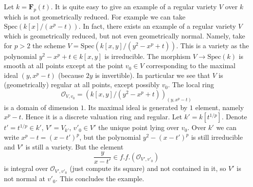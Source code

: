 \begin{example}
\label{example-geometrically-reduced-not-normal}
Let $k =\mathbf{F}_p(t)$. It is quite easy to give an example of a regular
variety $V$ over $k$ which is not geometrically reduced. For example we
can take $\text{Spec}(k[x]/(x^p - t))$. In fact, there exists an
example of a regular variety $V$ which is geometrically reduced, but
not even geometrically normal. Namely, take for $p > 2$ the scheme
$V = \text{Spec}(k[x, y]/(y^2 - x^p + t))$. This is a variety as the
polynomial $y^2 - x^p + t \in k[x, y]$ is irreducible.
The morphism $V \to \text{Spec}(k)$ is smooth at all points
except at the point $v_0 \in V$ corresponding to the maximal ideal
$(y, x^p - t)$ (because $2y$ is invertible). In particular we see that
$V$ is (geometrically) regular at all points, except possibly $v_0$.
The local ring
$$
\mathcal{O}_{V, v_0} = \left(k[x, y]/(y^2 - x^p + t)\right)_{(y, x^p - t)}
$$
is a domain of dimension $1$. Its maximal ideal is generated by $1$ element,
namely $x^p - t$. Hence it is a discrete valuation ring and regular.
Let $k' = k[t^{1/p}]$. Denote $t' = t^{1/p} \in k'$,
$V' = V_{k'}$, $v'_0 \in V'$ the unique point lying over $v_0$.
Over $k'$ we can write $x^p - t = (x - t')^p$, but the polynomial
$y^2 - (x - t')^p$ is still irreducible and $V'$ is still a variety.
But the element
$$
\frac{y}{x - t'} \in f.f.(\mathcal{O}_{V', v'_0})
$$
is integral over $\mathcal{O}_{V', v'_0}$ (just compute its square)
and not contained in it, so $V'$ is not normal at $v'_0$. This concludes
the example.
\end{example}










